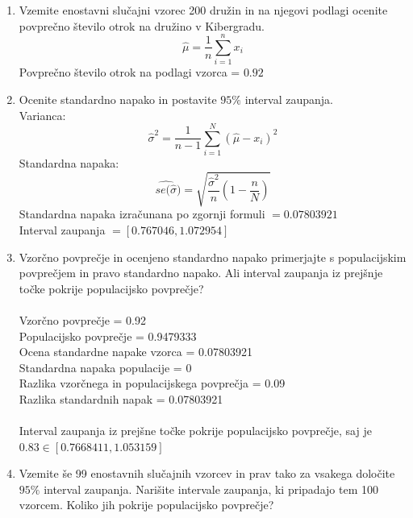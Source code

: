 \documentclass[a4paper]{article}
\begin{document}
\begin{enumerate}[label=(\alph*)]

\item Vzemite enostavni slučajni vzorec 200 družin in na njegovi podlagi ocenite povprečno število otrok na družino v Kibergradu. 
\begin{equation*}
\hat{\mu} = \frac{1}{n} \sum_{i=1}^{n} x_{i}
\end{equation*}
Povprečno število otrok na podlagi vzorca  = $0.92$

\item Ocenite standardno napako in postavite $95\%$ interval zaupanja. \\
Varianca:
\begin{equation*}
\hat{\sigma}^2 = \frac{1}{n-1} \sum_{i=1}^{N}(\hat{\mu}-x_{i})^2
\end{equation*}
Standardna napaka:
\begin{equation*}
\widehat{ se(\hat{\sigma}}) = \sqrt{\frac{\hat{\sigma}^2}{n} \left(1-\frac{n}{N}\right) }
\end{equation*}
Standardna napaka izračunana po zgornji formuli $ = 0.07803921$ \\
Interval zaupanja $= [0.767046, 1.072954]$

\item Vzorčno povprečje in ocenjeno standardno napako primerjajte s populacijskim povprečjem in pravo standardno napako. Ali interval zaupanja iz prejšnje točke pokrije populacijsko povprečje? \\ \\
Vzorčno povprečje = 0.92 \\
Populacijsko povprečje =  0.9479333 \\
Ocena standardne napake vzorca =  0.07803921 \\
Standardna napaka populacije =  0 \\
Razlika vzorčnega in populacijskega povprečja = 0.09 \\
Razlika standardnih napak = 0.07803921 \\ \\
Interval zaupanja iz prejšne točke pokrije populacijsko povprečje, saj je $0.83 \in [0.7668411, 1.053159]$

\item Vzemite še 99 enostavnih slučajnih vzorcev in prav tako za vsakega določite $95\%$ interval zaupanja. Narišite intervale zaupanja, ki pripadajo tem 100 vzorcem. Koliko jih pokrije populacijsko povprečje? \\ \


\end{enumerate}
\end{document}
